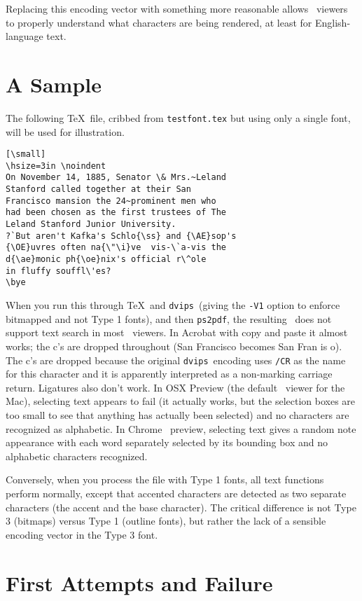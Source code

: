 \documentclass{ltugboat}
\def\PDF{\acro{PDF}}
\def\dvips{\texttt{dvips}}
\def\ps2pdf{\texttt{ps2pdf}}
\begin{document}
Replacing this encoding vector with something more
reasonable allows \PDF\ viewers to properly understand what
characters are being rendered, at least for English-language text.

\section{A Sample}

The following \TeX\ file, cribbed from \texttt{testfont.tex}
but using only a single font, will be used for illustration.

\begin{verbatim}[\small]
\hsize=3in \noindent
On November 14, 1885, Senator \& Mrs.~Leland
Stanford called together at their San
Francisco mansion the 24~prominent men who
had been chosen as the first trustees of The
Leland Stanford Junior University.
?`But aren't Kafka's Schlo{\ss} and {\AE}sop's
{\OE}uvres often na{\"\i}ve  vis-\`a-vis the
d{\ae}monic ph{\oe}nix's official r\^ole
in fluffy souffl\'es?
\bye
\end{verbatim}
\noindent
When you run this through \TeX\ and \dvips\
(giving the \texttt{-V1} option to enforce bitmapped
and not Type 1 fonts), and then \ps2pdf,
the resulting \PDF\ does not
support text search in most \PDF\ viewers.  In Acrobat
with copy and paste it almost works;
the c's are dropped throughout (San Francisco becomes
San Fran is o).  The c's are dropped because the
original \dvips\ encoding uses \texttt{/CR} as the
name for this character and it is apparently
interpreted as a non-marking carriage return.
Ligatures also don't work.  In OSX
Preview (the default \PDF\ viewer for the Mac),
selecting text appears to fail (it
actually works, but the selection boxes are too small
to see that anything has actually been selected) and
no characters are recognized as alphabetic.  In Chrome
\PDF\ preview, selecting text gives a random note
appearance with each word separately selected by its
bounding box and no alphabetic characters recognized.

Conversely, when you process the file with Type 1
fonts, all text functions perform normally, except that
accented characters are detected as two separate
characters (the accent and the base character).  The
critical difference is not Type 3 (bitmaps) versus
Type 1 (outline fonts), but rather the lack of a
sensible encoding vector in the Type 3 font.

\section{First Attempts and Failure}
\end{document}
